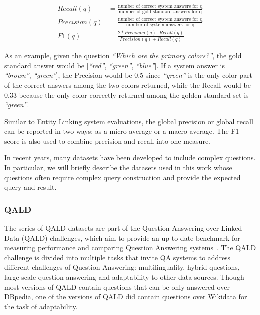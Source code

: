 \begin{equation}
    \begin{aligned}
    Recall(q) &= \frac{\mbox{number of correct system answers for q}}{\mbox{number of gold standard answers for q}} \\
    Precision(q) &= \frac{\mbox{number of correct system answers for q}}{\mbox{number of system answers for q}} \\
    F1(q) &= \frac{2 \ast Precision(q) \cdot Recall(q)}{Precision(q)+Recall(q)}
    \end{aligned}
\end{equation}

As an example, given the question \textit{“Which are the primary colors?”}, the gold standard 
answer would be [\textit{“red”}, \textit{“green”}, \textit{“blue”}]. If a system answer is [
\textit{“brown”}, \textit{“green”}], the Precision would be 0.5 since \textit{“green”} is the 
only color part of the correct answers among the two colors returned, while the Recall would be 
0.33 because the only color correctly returned among the golden standard set is \textit{“green”}.

Similar to Entity Linking system evaluations, the global precision or global recall can be 
reported in two ways: as a micro average or a macro average. The F1-score is also used to 
combine  precision and recall into one measure.

In recent years, many datasets have been developed to include complex questions. In particular, 
we will briefly describe the datasets used in this work whose questions often require complex 
query construction and provide the expected query and result.

\subsubsection{QALD}
\label{cap2:qakg/benchmarkDatasets/qald}
The series of QALD datasets are part of the Question Answering over Linked Data (QALD) challenges, 
which aim to provide an up-to-date benchmark for measuring performance and comparing Question 
Answering systems~\cite{qa:qald-Lopezetal2013}. The QALD challenge is divided into multiple 
tasks that invite QA systems to address different challenges of Question Answering: 
multilinguality, hybrid questions, large-scale question answering and adaptability to other 
data sources. Though most versions of QALD contain questions that can be only answered over 
DBpedia, one of the versions of QALD did contain questions over Wikidata for the task of 
adaptability.

